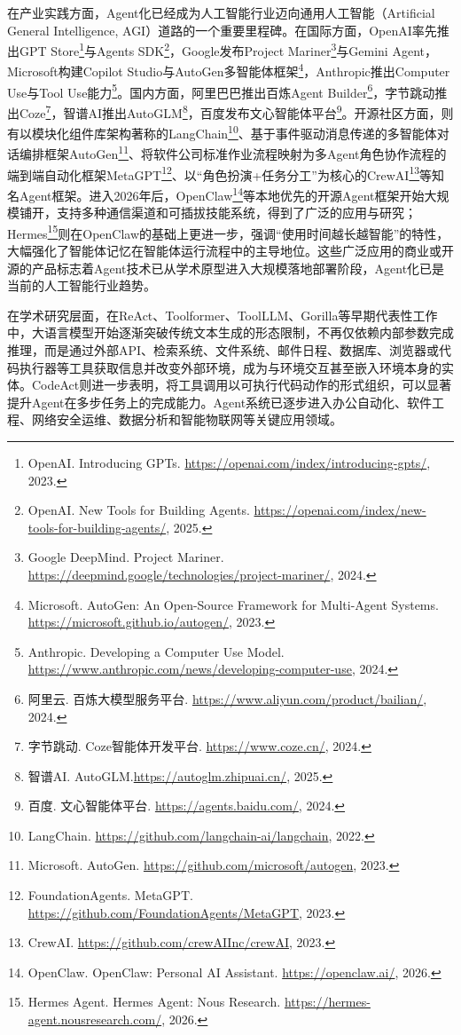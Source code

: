 在产业实践方面，Agent化已经成为人工智能行业迈向通用人工智能（Artificial General Intelligence, AGI）道路的一个重要里程碑。在国际方面，OpenAI率先推出GPT Store\footnote{OpenAI. Introducing GPTs. \url{https://openai.com/index/introducing-gpts/}, 2023.}与Agents SDK\footnote{OpenAI. New Tools for Building Agents. \url{https://openai.com/index/new-tools-for-building-agents/}, 2025.}，Google发布Project Mariner\footnote{Google DeepMind. Project Mariner. \url{https://deepmind.google/technologies/project-mariner/}, 2024.}与Gemini Agent，Microsoft构建Copilot Studio与AutoGen多智能体框架\footnote{Microsoft. AutoGen: An Open-Source Framework for Multi-Agent Systems. \url{https://microsoft.github.io/autogen/}, 2023.}，Anthropic推出Computer Use与Tool Use能力\footnote{Anthropic. Developing a Computer Use Model. \url{https://www.anthropic.com/news/developing-computer-use}, 2024.}。国内方面，阿里巴巴推出百炼Agent Builder\footnote{阿里云. 百炼大模型服务平台. \url{https://www.aliyun.com/product/bailian/}, 2024.}，字节跳动推出Coze\footnote{字节跳动. Coze智能体开发平台. \url{https://www.coze.cn/}, 2024.}，智谱AI推出AutoGLM\footnote{智谱AI. AutoGLM.\url{https://autoglm.zhipuai.cn/}, 2025.}，百度发布文心智能体平台\footnote{百度. 文心智能体平台. \url{https://agents.baidu.com/}, 2024.}。开源社区方面，则有以模块化组件库架构著称的LangChain\footnote{LangChain. \url{https://github.com/langchain-ai/langchain}, 2022.}、基于事件驱动消息传递的多智能体对话编排框架AutoGen\footnote{Microsoft. AutoGen. \url{https://github.com/microsoft/autogen}, 2023.}、将软件公司标准作业流程映射为多Agent角色协作流程的端到端自动化框架MetaGPT\footnote{FoundationAgents. MetaGPT. \url{https://github.com/FoundationAgents/MetaGPT}, 2023.}、以“角色扮演+任务分工”为核心的CrewAI\footnote{CrewAI. \url{https://github.com/crewAIInc/crewAI}, 2023.}等知名Agent框架。进入2026年后，OpenClaw\footnote{OpenClaw. OpenClaw: Personal AI Assistant. \url{https://openclaw.ai/}, 2026.}等本地优先的开源Agent框架开始大规模铺开，支持多种通信渠道和可插拔技能系统，得到了广泛的应用与研究；Hermes\footnote{Hermes Agent. Hermes Agent: Nous Research. \url{https://hermes-agent.nousresearch.com/}, 2026.}则在OpenClaw的基础上更进一步，强调“使用时间越长越智能”的特性，大幅强化了智能体记忆在智能体运行流程中的主导地位。这些广泛应用的商业或开源的产品标志着Agent技术已从学术原型进入大规模落地部署阶段，Agent化已是当前的人工智能行业趋势。

在学术研究层面，在ReAct\cite{yao2023react}、Toolformer\cite{schick2023toolformer}、ToolLLM\cite{qin2024toolllm}、Gorilla\cite{patil2024gorilla}等早期代表性工作中，大语言模型开始逐渐突破传统文本生成的形态限制，不再仅依赖内部参数完成推理，而是通过外部API、检索系统、文件系统、邮件日程、数据库、浏览器或代码执行器等工具获取信息并改变外部环境，成为与环境交互甚至嵌入环境本身的实体。CodeAct\cite{wang2024codeact}则进一步表明，将工具调用以可执行代码动作的形式组织，可以显著提升Agent在多步任务上的完成能力。Agent系统已逐步进入办公自动化、软件工程、网络安全运维、数据分析和智能物联网等关键应用领域\cite{wang2024survey_agents,xi2025rise,park2023generative}。

